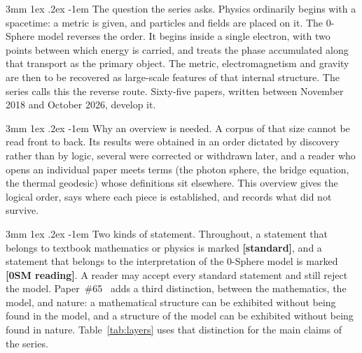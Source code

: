 \documentclass[%
 reprint, amsmath,amssymb, aps, prb, ]{revtex4-2}
\makeatletter
\numberwithin{equation}{section}
\renewcommand\paragraph{%
  \@startsection{paragraph}{4}{\z@}%
    {3mm \@plus 1ex \@minus .2ex}%
    {-1em}%
    {\normalfont\normalsize\itshape}}
\makeatother
\begin{document}
\paragraph{The question the series asks.} Physics ordinarily begins with a spacetime: a metric is given, and particles and fields are placed on it. The 0-Sphere model reverses the order. It begins inside a single electron, with two points between which energy is carried, and treats the phase accumulated along that transport as the primary object. The metric, electromagnetism and gravity are then to be recovered as large-scale features of that internal structure. The series calls this the reverse route. Sixty-five papers, written between November 2018 and October 2026, develop it.

\paragraph{Why an overview is needed.} A corpus of that size cannot be read front to back. Its results were obtained in an order dictated by discovery rather than by logic, several were corrected or withdrawn later, and a reader who opens an individual paper meets terms (the photon sphere, the bridge equation, the thermal geodesic) whose definitions sit elsewhere. This overview gives the logical order, says where each piece is established, and records what did not survive.

\paragraph{Two kinds of statement.} Throughout, a statement that belongs to textbook mathematics or physics is marked \textbf{[standard]}, and a statement that belongs to the interpretation of the 0-Sphere model is marked \textbf{[0SM reading]}. A reader may accept every standard statement and still reject the model. Paper~\#65~\cite{hanamura65} adds a third distinction, between the mathematics, the model, and nature: a mathematical structure can be exhibited without being found in the model, and a structure of the model can be exhibited without being found in nature. Table~\ref{tab:layers} uses that distinction for the main claims of the series.
\end{document}

